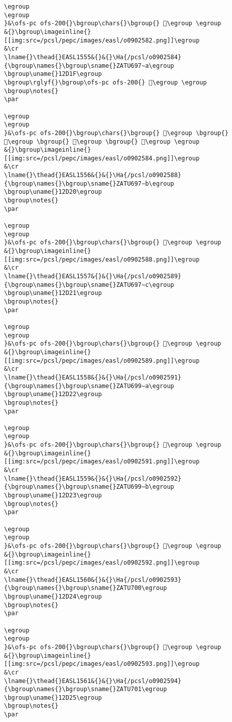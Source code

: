 \begin{verbatim}
\egroup
\egroup
}&\ofs-pc ofs-200{}\bgroup\chars{}\bgroup{} 𒴛\egroup \egroup
&{}\bgroup\imageinline{}[[img:src=/pcsl/pepc/images/easl/o0902582.png]]\egroup
&\cr
\lname{}\thead{}EASL1555&{}&{}\Ha{/pcsl/o0902584}{\bgroup\names{}\bgroup\sname{}ZATU697∼a\egroup
\bgroup\uname{}12D1F\egroup
\bgroup\rglyf{}\bgroup\ofs-pc ofs-200{} 𒴟\egroup \egroup
\bgroup\notes{}
\par 

\egroup
\egroup
}&\ofs-pc ofs-200{}\bgroup\chars{}\bgroup{} 𒴜\egroup \bgroup{} 𒴝\egroup \bgroup{} 𒴞\egroup \bgroup{} 𒴟\egroup \egroup
&{}\bgroup\imageinline{}[[img:src=/pcsl/pepc/images/easl/o0902584.png]]\egroup
&\cr
\lname{}\thead{}EASL1556&{}&{}\Ha{/pcsl/o0902588}{\bgroup\names{}\bgroup\sname{}ZATU697∼b\egroup
\bgroup\uname{}12D20\egroup
\bgroup\notes{}
\par 

\egroup
\egroup
}&\ofs-pc ofs-200{}\bgroup\chars{}\bgroup{} 𒴠\egroup \egroup
&{}\bgroup\imageinline{}[[img:src=/pcsl/pepc/images/easl/o0902588.png]]\egroup
&\cr
\lname{}\thead{}EASL1557&{}&{}\Ha{/pcsl/o0902589}{\bgroup\names{}\bgroup\sname{}ZATU697∼c\egroup
\bgroup\uname{}12D21\egroup
\bgroup\notes{}
\par 

\egroup
\egroup
}&\ofs-pc ofs-200{}\bgroup\chars{}\bgroup{} 𒴡\egroup \egroup
&{}\bgroup\imageinline{}[[img:src=/pcsl/pepc/images/easl/o0902589.png]]\egroup
&\cr
\lname{}\thead{}EASL1558&{}&{}\Ha{/pcsl/o0902591}{\bgroup\names{}\bgroup\sname{}ZATU699∼a\egroup
\bgroup\uname{}12D22\egroup
\bgroup\notes{}
\par 

\egroup
\egroup
}&\ofs-pc ofs-200{}\bgroup\chars{}\bgroup{} 𒴢\egroup \egroup
&{}\bgroup\imageinline{}[[img:src=/pcsl/pepc/images/easl/o0902591.png]]\egroup
&\cr
\lname{}\thead{}EASL1559&{}&{}\Ha{/pcsl/o0902592}{\bgroup\names{}\bgroup\sname{}ZATU699∼b\egroup
\bgroup\uname{}12D23\egroup
\bgroup\notes{}
\par 

\egroup
\egroup
}&\ofs-pc ofs-200{}\bgroup\chars{}\bgroup{} 𒴣\egroup \egroup
&{}\bgroup\imageinline{}[[img:src=/pcsl/pepc/images/easl/o0902592.png]]\egroup
&\cr
\lname{}\thead{}EASL1560&{}&{}\Ha{/pcsl/o0902593}{\bgroup\names{}\bgroup\sname{}ZATU700\egroup
\bgroup\uname{}12D24\egroup
\bgroup\notes{}
\par 

\egroup
\egroup
}&\ofs-pc ofs-200{}\bgroup\chars{}\bgroup{} 𒴤\egroup \egroup
&{}\bgroup\imageinline{}[[img:src=/pcsl/pepc/images/easl/o0902593.png]]\egroup
&\cr
\lname{}\thead{}EASL1561&{}&{}\Ha{/pcsl/o0902594}{\bgroup\names{}\bgroup\sname{}ZATU701\egroup
\bgroup\uname{}12D25\egroup
\bgroup\notes{}
\par 


\end{verbatim}
